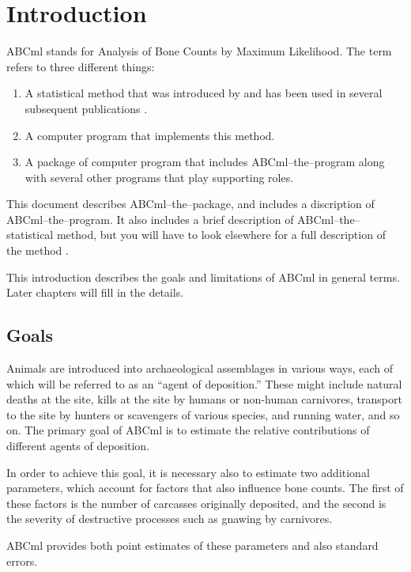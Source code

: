 \chapter{Introduction\label{ch.intro}}%

ABCml stands for Analysis of Bone Counts by Maximum Likelihood.  The term
refers to three different things:
\begin{enumerate}
\item A statistical method that was introduced by \citet{Rogers:JAS-27-111}
  and has been used in several subsequent publications
  \citep{Rogers:JAS-27-635,Rogers:AA-00-x,Rogers:JAS-00}.
\item A computer program that implements this method.
\item A package of computer program that includes ABCml--the--program along
  with several other programs that play supporting roles.
\end{enumerate}
This document describes ABCml--the--package, and includes a discription of
ABCml--the--program.  It also includes a brief description of
ABCml--the--statistical method, but you will have to look elsewhere for a full
description of the method \citep{Rogers:JAS-27-111}.

This introduction describes the goals and limitations of ABCml in general
terms.  Later chapters will fill in the details.

\section{Goals}

Animals are introduced into archaeological assemblages in various ways, each
of which will be referred to as an ``agent of deposition.''  These might
include natural deaths at the site, kills at the site by humans or non-human
carnivores, transport to the site by hunters or scavengers of various species,
and running water, and so on.  The primary goal of ABCml is to estimate the
relative contributions of different agents of deposition.

In order to achieve this goal, it is necessary also to estimate two additional
parameters, which account for factors that also influence bone counts.  The
first of these factors is the number of carcasses originally deposited, and
the second is the severity of destructive processes such as gnawing by
carnivores. 

ABCml provides both point estimates of these parameters and also standard
errors. 

